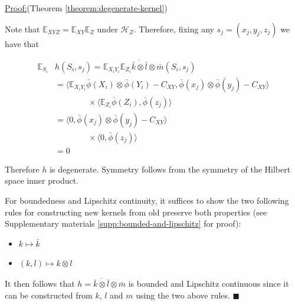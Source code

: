 \documentclass[]{article}
\newenvironment{claimproof}[1]{\par\noindent\underline{Proof:}\space#1}{\hfill $\blacksquare$}
\begin{document}
\begin{claimproof}(Theorem \ref{theorem:degenerate-kernel})

Note that $\mathbb{E}_{XYZ} = \mathbb{E}_{XY}\mathbb{E}_Z$ under $\mathcal{H}_Z$. Therefore, fixing any $s_j = (x_j,y_j,z_j)$ we have that

\begin{align*}
\mathbb{E}_{S_i}&h(S_i,s_j) = \mathbb{E}_{X_iY_i} \mathbb{E}_{Z_i}\overline{\bar{k}\otimes\bar{l}}\otimes\bar{m} (S_i,s_j) \\
 &=  \langle\mathbb{E}_{X_iY_i}\bar{\phi}(X_i)\otimes\bar{\phi}(Y_i) - C_{XY},\bar{\phi}(x_j)\otimes\bar{\phi}(y_j) - C_{XY}\rangle \\
 &\quad \quad \quad \quad \times \langle \mathbb{E}_{Z_i}\bar{\phi}(Z_i),\bar{\phi}(z_j)\rangle \\
 &=  \langle 0 ,\bar{\phi}(x_j)\otimes\bar{\phi}(y_j) - C_{XY}\rangle \\
 &\quad \quad \quad \quad \times \langle 0 ,\bar{\phi}(z_j)\rangle \\ 
 & = 0
\end{align*}

Therefore $h$ is degenerate. Symmetry follows from the symmetry of the Hilbert space inner product.

For boundedness and Lipschitz continuity, it suffices to show the two following rules for constructing new kernels from old preserve both properties (see Supplementary materials \ref{supp:bounded-and-lipschitz} for proof):
\begin{itemize} \setlength\itemsep{0em}
\item $k \mapsto \bar{k}$ 
\item $(k,l) \mapsto k \otimes l$
\end{itemize}
It then follows that $h = \overline{\bar{k}\otimes\bar{l}}\otimes\bar{m}$ is bounded and Lipschitz continuous since it can be constructed from $k$, $l$ and $m$ using the two above rules.
\end{claimproof}
\end{document}
